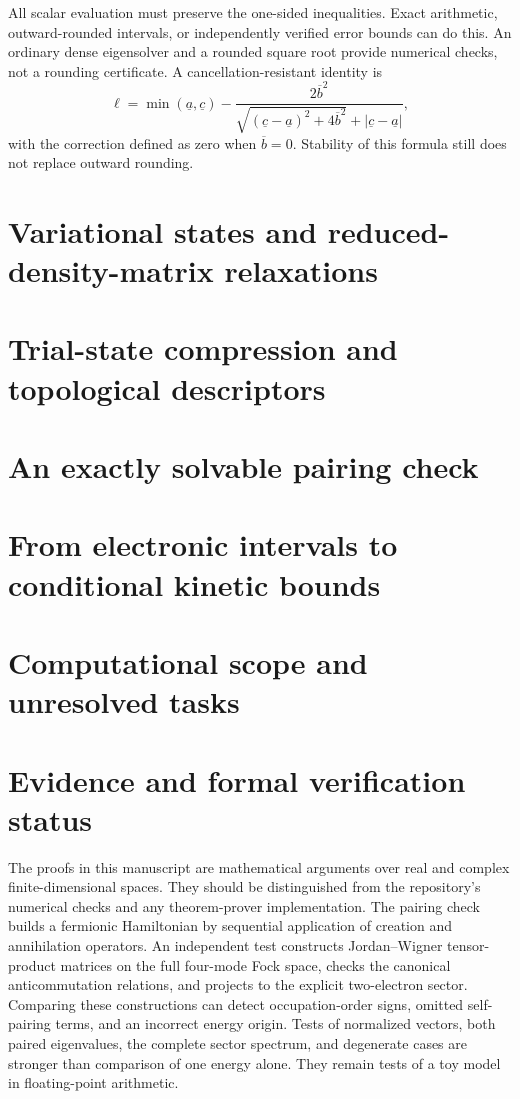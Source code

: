 \documentclass[11pt,a4paper]{article}
\theoremstyle{plain}
\theoremstyle{definition}
\theoremstyle{remark}
\begin{document}
All scalar evaluation must preserve the one-sided inequalities. Exact
arithmetic, outward-rounded intervals, or independently verified error bounds
can do this. An ordinary dense eigensolver and a rounded square root provide
numerical checks, not a rounding certificate. A cancellation-resistant identity
is
\[
 \ell=\min(\underline a,\underline c)
 -\frac{2\overline b^2}
 {\sqrt{(\underline c-\underline a)^2+4\overline b^2}
       +|\underline c-\underline a|},
\]
with the correction defined as zero when $\overline b=0$. Stability of this
formula still does not replace outward rounding.

\section{Variational states and reduced-density-matrix relaxations}
\label{sec:rdm}

\section{Trial-state compression and topological descriptors}
\label{sec:tensor}

\section{An exactly solvable pairing check}
\label{sec:algebra}

\section{From electronic intervals to conditional kinetic bounds}
\label{sec:approximations}

\section{Computational scope and unresolved tasks}
\label{sec:complexity}



\section{Evidence and formal verification status}
\label{sec:formalization}
The proofs in this manuscript are mathematical arguments over real and
complex finite-dimensional spaces. They should be distinguished from the
repository's numerical checks and any theorem-prover implementation.
The pairing check builds a fermionic Hamiltonian by sequential application
of creation and annihilation operators. An independent test constructs
Jordan--Wigner tensor-product matrices on the full four-mode Fock space,
checks the canonical anticommutation relations, and projects to the explicit
two-electron sector. Comparing these constructions can detect occupation-order
signs, omitted self-pairing terms, and an incorrect energy origin. Tests of
normalized vectors, both paired eigenvalues, the complete sector spectrum, and
degenerate cases are stronger than comparison of one energy alone. They remain
tests of a toy model in floating-point arithmetic.
\end{document}
